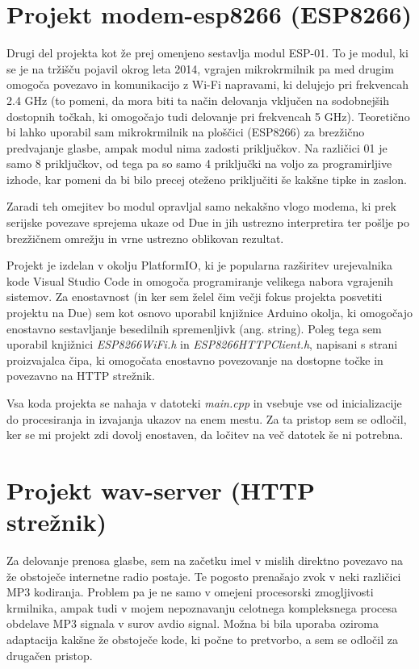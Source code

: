 \documentclass[12pt,a4paper,twoside,openright,slovene]{book}
\begin{document}
\section{Projekt modem-esp8266 (ESP8266)} \label{modem_esp8266_projekt}
Drugi del projekta kot že prej omenjeno sestavlja modul ESP-01. To je modul, ki se je na tržišču pojavil okrog leta 2014, vgrajen mikrokrmilnik pa med drugim omogoča povezavo in komunikacijo z Wi-Fi napravami, ki delujejo pri frekvencah 2.4 GHz (to pomeni, da mora biti ta način delovanja vključen na sodobnejših dostopnih točkah, ki omogočajo tudi delovanje pri frekvencah 5 GHz). Teoretično bi lahko uporabil sam mikrokrmilnik na ploščici (ESP8266) za brezžično predvajanje glasbe, ampak modul nima zadosti priključkov. Na različici 01 je samo 8 priključkov, od tega pa so samo 4 priključki na voljo za programirljive izhode, kar pomeni da bi bilo precej oteženo priključiti še kakšne tipke in zaslon.

Zaradi teh omejitev bo modul opravljal samo nekakšno vlogo modema, ki prek serijske povezave sprejema ukaze od Due in jih ustrezno interpretira ter pošlje po brezžičnem omrežju in vrne ustrezno oblikovan rezultat.

Projekt je izdelan v okolju PlatformIO, ki je popularna razširitev urejevalnika kode Visual Studio Code in omogoča programiranje velikega nabora vgrajenih sistemov. Za enostavnost (in ker sem želel čim večji fokus projekta posvetiti projektu na Due) sem kot osnovo uporabil knjižnice Arduino okolja, ki omogočajo enostavno sestavljanje besedilnih spremenljivk (ang. string). Poleg tega sem uporabil knjižnici \textit{ESP8266WiFi.h} in \textit{ESP8266HTTPClient.h}, napisani s strani proizvajalca čipa, ki omogočata enostavno povezovanje na dostopne točke in povezavno na HTTP strežnik.

Vsa koda projekta se nahaja v datoteki \textit{main.cpp} in vsebuje vse od inicializacije do procesiranja in izvajanja ukazov na enem mestu. Za ta pristop sem se odločil, ker se mi projekt zdi dovolj enostaven, da ločitev na več datotek še ni potrebna.

\section{Projekt wav-server (HTTP strežnik)} \label{wav_server_projekt}
Za delovanje prenosa glasbe, sem na začetku imel v mislih direktno povezavo na že obstoječe internetne radio postaje. Te pogosto prenašajo zvok v neki različici MP3 kodiranja. Problem pa je ne samo v omejeni procesorski zmogljivosti krmilnika, ampak tudi v mojem nepoznavanju celotnega kompleksnega procesa obdelave MP3 signala v surov avdio signal. Možna bi bila uporaba oziroma adaptacija kakšne že obstoječe kode, ki počne to pretvorbo, a sem se odločil za drugačen pristop.
\end{document}
